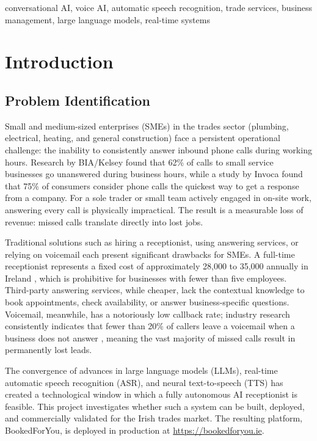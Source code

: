 \documentclass[conference]{IEEEtran}
\begin{document}
\begin{IEEEkeywords}
conversational AI, voice AI, automatic speech recognition, trade services, business management, large language models, real-time systems
\end{IEEEkeywords}


\section{Introduction}

\subsection{Problem Identification}

Small and medium-sized enterprises (SMEs) in the trades sector (plumbing, electrical, heating, and general construction) face a persistent operational challenge: the inability to consistently answer inbound phone calls during working hours. Research by BIA/Kelsey \cite{b12} found that 62\% of calls to small service businesses go unanswered during business hours, while a study by Invoca \cite{b14} found that 75\% of consumers consider phone calls the quickest way to get a response from a company. For a sole trader or small team actively engaged in on-site work, answering every call is physically impractical. The result is a measurable loss of revenue: missed calls translate directly into lost jobs.

Traditional solutions such as hiring a receptionist, using answering services, or relying on voicemail each present significant drawbacks for SMEs. A full-time receptionist represents a fixed cost of approximately \texteuro{}28,000 to \texteuro{}35,000 annually in Ireland \cite{b5}, which is prohibitive for businesses with fewer than five employees. Third-party answering services, while cheaper, lack the contextual knowledge to book appointments, check availability, or answer business-specific questions. Voicemail, meanwhile, has a notoriously low callback rate; industry research consistently indicates that fewer than 20\% of callers leave a voicemail when a business does not answer \cite{b13}, meaning the vast majority of missed calls result in permanently lost leads.

The convergence of advances in large language models (LLMs), real-time automatic speech recognition (ASR), and neural text-to-speech (TTS) has created a technological window in which a fully autonomous AI receptionist is feasible. This project investigates whether such a system can be built, deployed, and commercially validated for the Irish trades market. The resulting platform, BookedForYou, is deployed in production at \url{https://bookedforyou.ie}.
\end{document}
